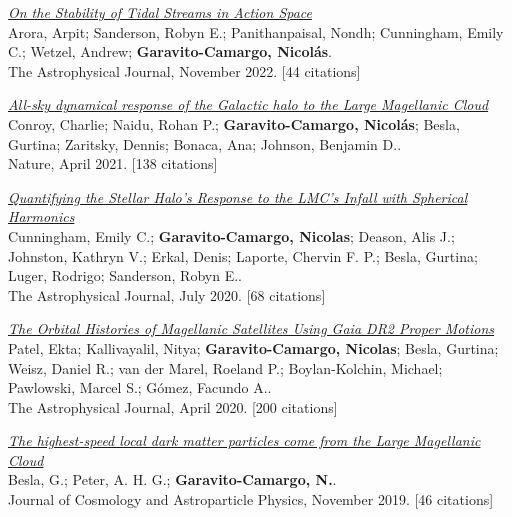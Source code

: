 \documentclass[14pt]{article}
\begin{document}
\begin{etaremune}
\item \textit{\href{https://ui.adsabs.harvard.edu/abs/2022ApJ...939....2A/abstract}{On the Stability of Tidal Streams in Action Space}}\\
  {\small \color{darkgray} Arora, Arpit; Sanderson, Robyn E.; Panithanpaisal, Nondh; Cunningham, Emily C.; Wetzel, Andrew; \textbf{Garavito-Camargo, Nicolás}.\\
  The Astrophysical Journal, November 2022. [44 citations]}

\item \textit{\href{https://ui.adsabs.harvard.edu/abs/2021Natur.592..534C/abstract}{All-sky dynamical response of the Galactic halo to the Large Magellanic Cloud}}\\
  {\small \color{darkgray} Conroy, Charlie; Naidu, Rohan P.; \textbf{Garavito-Camargo, Nicolás}; Besla, Gurtina; Zaritsky, Dennis; Bonaca, Ana; Johnson, Benjamin D..\\
  Nature, April 2021. [138 citations]}

\item \textit{\href{https://ui.adsabs.harvard.edu/abs/2020ApJ...898....4C/abstract}{Quantifying the Stellar Halo's Response to the LMC's Infall with Spherical Harmonics}}\\
  {\small \color{darkgray} Cunningham, Emily C.; \textbf{Garavito-Camargo, Nicolas}; Deason, Alis J.; Johnston, Kathryn V.; Erkal, Denis; Laporte, Chervin F. P.; Besla, Gurtina; Luger, Rodrigo; Sanderson, Robyn E..\\
  The Astrophysical Journal, July 2020. [68 citations]}

\item \textit{\href{https://ui.adsabs.harvard.edu/abs/2020ApJ...893..121P/abstract}{The Orbital Histories of Magellanic Satellites Using Gaia DR2 Proper Motions}}\\
  {\small \color{darkgray} Patel, Ekta; Kallivayalil, Nitya; \textbf{Garavito-Camargo, Nicolas}; Besla, Gurtina; Weisz, Daniel R.; van der Marel, Roeland P.; Boylan-Kolchin, Michael; Pawlowski, Marcel S.; Gómez, Facundo A..\\
  The Astrophysical Journal, April 2020. [200 citations]}

\item \textit{\href{https://ui.adsabs.harvard.edu/abs/2019JCAP...11..013B/abstract}{The highest-speed local dark matter particles come from the Large Magellanic Cloud}}\\
  {\small \color{darkgray} Besla, G.; Peter, A. H. G.; \textbf{Garavito-Camargo, N.}.\\
  Journal of Cosmology and Astroparticle Physics, November 2019. [46 citations]}


\end{etaremune}
\end{document}
